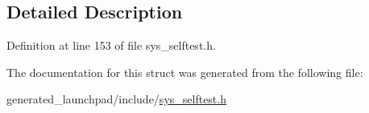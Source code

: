 \subsection{Detailed Description}


Definition at line 153 of file sys\+\_\+selftest.\+h.



The documentation for this struct was generated from the following file\+:\begin{DoxyCompactItemize}
\item 
generated\+\_\+launchpad/include/\mbox{\hyperlink{sys__selftest_8h}{sys\+\_\+selftest.\+h}}\end{DoxyCompactItemize}
